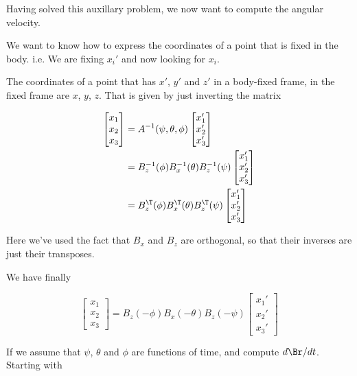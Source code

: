 Having solved this auxillary problem, we now want to compute the angular velocity.

We want to know how to express the coordinates of a point that is fixed in the body.  i.e. We are fixing $x_i'$ and now looking for $x_i$.

The coordinates of a point that has $x'$, $y'$ and $z'$ in a body-fixed frame, in the fixed frame are $x$, $y$, $z$.  That is given by just inverting the matrix

\begin{align*}
\begin{bmatrix}
x_1 \\
x_2 \\
x_3
\end{bmatrix}
&=
A^{-1}(\psi, \theta, \phi)
\begin{bmatrix}
x_1' \\
x_2' \\
x_3'
\end{bmatrix} \\
&=
B_z^{-1}(\phi)
B_x^{-1}(\theta)
B_z^{-1}(\psi)
\begin{bmatrix}
x_1' \\
x_2' \\
x_3'
\end{bmatrix} \\
&=
B_z^{\T}(\phi)
B_x^{\T}(\theta)
B_z^{\T}(\psi)
\begin{bmatrix}
x_1' \\
x_2' \\
x_3'
\end{bmatrix}
\end{align*}

Here we've used the fact that $B_x$ and $B_z$ are orthogonal, so that their inverses are just their transposes.

We have finally

\begin{equation}\label{eqn:classicalMechanicsEulerAngles:n}
\begin{bmatrix}
x_1 \\
x_2 \\
x_3
\end{bmatrix}
=
B_z(-\phi)
B_x(-\theta)
B_z(-\psi)
\begin{bmatrix}
x_1' \\
x_2' \\
x_3'
\end{bmatrix} 
\end{equation}

If we assume that $\psi$, $\theta$ and $\phi$ are functions of time, and compute $d \Br/dt$.  Starting with

